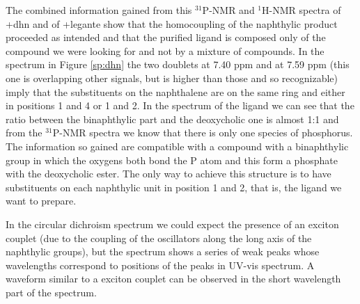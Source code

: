     The combined information gained from this $^{31}$P-NMR and $^{1}$H-NMR spectra of \cmpd+{dhn} and of \cmpd+{legante} show that the homocoupling of the naphthylic product proceeded as intended and that the purified ligand is composed only of the compound we were looking for and not by a mixture of compounds.
    In the spectrum in Figure \ref{sp:dhn} the two doublets at 7.40 ppm and at 7.59 ppm (this one is overlapping other signals, but is higher than those and so recognizable) imply that the substituents on the naphthalene are on the same ring and either in positions 1 and 4 or 1 and 2. In the spectrum of the ligand we can see that the ratio between the bi\-naphthylic part and the de\-oxy\-cholic one is almost 1:1 and from the $^{31}$P-NMR spectra we know that there is only one species of phosphorus.
    The information so gained are compatible with a compound with a bi\-naphthylic group in which the oxygens both bond the P atom and this form a phosphate with the de\-oxy\-cholic ester. The only way to achieve this structure is to have substituents on each naphthylic unit in position 1 and 2, that is, the ligand we want to prepare.

    In the circular dichroism spectrum we could expect the presence of an exciton couplet (due to the coupling of the oscillators along the long axis of the naphthylic groups), but the spectrum shows a series of weak peaks whose wavelengths correspond to positions of the peaks in UV-vis spectrum. %
    A waveform similar to a exciton couplet can be observed in the short wavelength part of the spectrum. 



